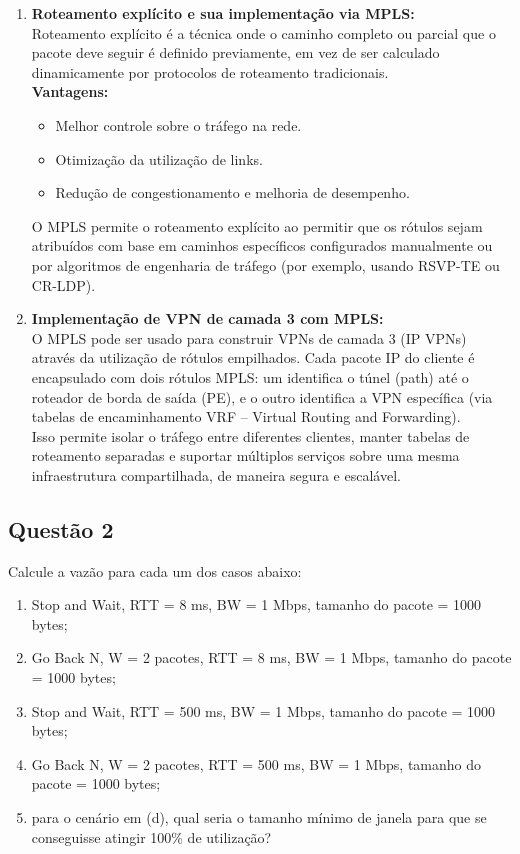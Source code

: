 \begin{enumerate}[label=\alph*.]
    \item \textbf{Roteamento explícito e sua implementação via MPLS:} \\
    Roteamento explícito é a técnica onde o caminho completo ou parcial que o pacote deve seguir é definido previamente, em vez de ser calculado dinamicamente por protocolos de roteamento tradicionais.\\

    \textbf{Vantagens:}
    \begin{itemize}
        \item Melhor controle sobre o tráfego na rede.
        \item Otimização da utilização de links.
        \item Redução de congestionamento e melhoria de desempenho.
    \end{itemize}

    O MPLS permite o roteamento explícito ao permitir que os rótulos sejam atribuídos com base em caminhos específicos configurados manualmente ou por algoritmos de engenharia de tráfego (por exemplo, usando RSVP-TE ou CR-LDP).

    \item \textbf{Implementação de VPN de camada 3 com MPLS:} \\
    O MPLS pode ser usado para construir VPNs de camada 3 (IP VPNs) através da utilização de rótulos empilhados. Cada pacote IP do cliente é encapsulado com dois rótulos MPLS: um identifica o túnel (path) até o roteador de borda de saída (PE), e o outro identifica a VPN específica (via tabelas de encaminhamento VRF – Virtual Routing and Forwarding).\\

    Isso permite isolar o tráfego entre diferentes clientes, manter tabelas de roteamento separadas e suportar múltiplos serviços sobre uma mesma infraestrutura compartilhada, de maneira segura e escalável.
\end{enumerate}

\subsection{Questão 2}
 Calcule a vazão para cada um dos casos abaixo:

\begin{enumerate}[label=\alph*.]
    \item Stop and Wait, RTT = 8 ms, BW = 1 Mbps, tamanho do pacote = 1000 bytes;
    \item Go Back N, W = 2 pacotes, RTT = 8 ms, BW = 1 Mbps, tamanho do pacote = 1000
bytes;
    \item Stop and Wait, RTT = 500 ms, BW = 1 Mbps, tamanho do pacote = 1000 bytes;
    \item  Go Back N, W = 2 pacotes, RTT = 500 ms, BW = 1 Mbps, tamanho do pacote = 1000
bytes;
    \item para o cenário em (d), qual seria o tamanho mínimo de janela para que se
conseguisse atingir 100\% de utilização? 
\end{enumerate}

